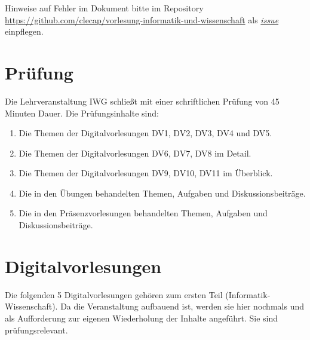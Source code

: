\documentclass[a4paper]{article}%
\begin{document}
Hinweise auf Fehler im Dokument bitte im Repository \url{https://github.com/clecap/vorlesung-informatik-und-wissenschaft}
als \href{https://github.com/clecap/vorlesung-informatik-und-wissenschaft/issues}{\textit{issue}} einpflegen.

\clearpage



\section{Prüfung}\label{Prüfung}

Die Lehrveranstaltung IWG schließt mit einer schriftlichen Prüfung von 45 Minuten Dauer.
Die Prüfungsinhalte sind:

\begin{enumerate}
\item Die Themen der Digitalvorlesungen DV1, DV2, DV3, DV4 und DV5.
\item Die Themen der Digitalvorlesungen DV6, DV7, DV8 im Detail.
\item Die Themen der Digitalvorlesungen DV9, DV10, DV11 im Überblick.
\item Die in den Übungen behandelten Themen, Aufgaben und Diskussionsbeiträge.
\item Die in den Präsenzvorlesungen behandelten Themen, Aufgaben und Diskussionsbeiträge.
\end{enumerate}


\clearpage



\hypertarget{Digitalvorlesung}{}
\section{Digitalvorlesungen}\label{Digitalvorlesung}\label{DV}


\def\video#1#2#3#4{\textbf{#1}\newline{\textbf{Video:}\tabto{2cm}\faYoutubePlay~#2 (Dauer #4)}%
\newline\textbf{Skriptum:}\href{#3}{\tabto{2cm}\faFilePdfO~\tt #3} }


Die folgenden 5 Digitalvorlesungen gehören zum ersten Teil
(Informatik-Wissenschaft). Da die Veranstaltung aufbauend ist, werden sie
hier nochmals und als Aufforderung zur eigenen Wiederholung der
Inhalte angeführt. Sie sind prüfungsrelevant.
\end{document}
